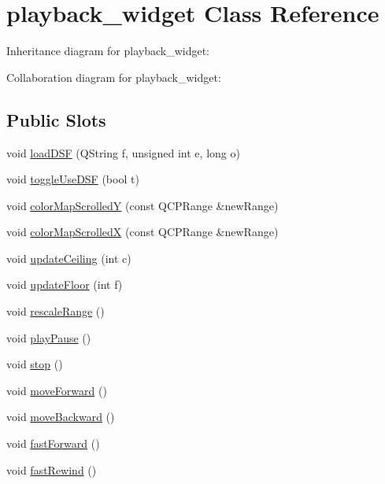 \hypertarget{classplayback__widget}{\section{playback\+\_\+widget Class Reference}
\label{classplayback__widget}
}


Inheritance diagram for playback\+\_\+widget\+:


Collaboration diagram for playback\+\_\+widget\+:
\subsection*{Public Slots}
\begin{DoxyCompactItemize}
\item 
void \hyperlink{classplayback__widget_a8015df0d0df7cba593227506f2363454}{load\+D\+S\+F} (Q\+String f, unsigned int e, long o)
\item 
void \hyperlink{classplayback__widget_acc2446121a9253d0bf375535f5376b4f}{toggle\+Use\+D\+S\+F} (bool t)
\item 
void \hyperlink{group__plotfunc_gac31ae6a43fc74935f3464cc745ddd295}{color\+Map\+Scrolled\+Y} (const Q\+C\+P\+Range \&new\+Range)
\item 
void \hyperlink{group__plotfunc_gac8bc93f4d7ac6c29990147f901ce21f9}{color\+Map\+Scrolled\+X} (const Q\+C\+P\+Range \&new\+Range)
\item 
void \hyperlink{group__plotfunc_ga69e639dbe803f1a6ce375e6669c7299c}{update\+Ceiling} (int c)
\item 
void \hyperlink{group__plotfunc_ga4289b12c3b445a24b0c70a4d38f3eff4}{update\+Floor} (int f)
\item 
void \hyperlink{group__plotfunc_gabe98b74caa29f3d46d1061b87dd6490f}{rescale\+Range} ()
\item 
void \hyperlink{group__playback_ga29ce224165d692b1747805631445559d}{play\+Pause} ()
\item 
void \hyperlink{group__playback_gac7dc7d508c0369527e824690b855bedb}{stop} ()
\item 
void \hyperlink{group__playback_gae6c7dc764a8923173ba073a439e6c1d0}{move\+Forward} ()
\item 
void \hyperlink{group__playback_gaaac6b8a27b81f2d431840f8ffa8f7c72}{move\+Backward} ()
\item 
void \hyperlink{group__playback_gaef6f962616f5e88be9dd73d08201eee3}{fast\+Forward} ()
\item 
void \hyperlink{group__playback_ga852358db15af739882adc86c17383152}{fast\+Rewind} ()
\end{DoxyCompactItemize}
